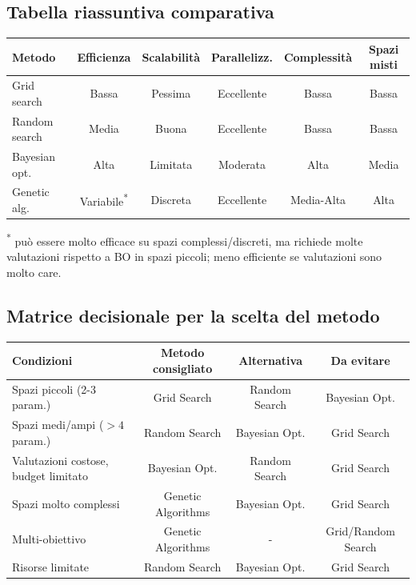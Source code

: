 \documentclass[a4paper,12pt]{report}
\begin{document}
	\subsection{Tabella riassuntiva comparativa}
	\begin{table}[H]
		\centering
		\small
		\begin{tabular}{lccccc}
			\toprule
			\textbf{Metodo} & \textbf{Efficienza} & \textbf{Scalabilità} & \textbf{Parallelizz.} & \textbf{Complessità} & \textbf{Spazi misti}\\
			\midrule
			Grid search & Bassa & Pessima & Eccellente & Bassa & Bassa\\
			Random search & Media & Buona & Eccellente & Bassa & Bassa\\
			Bayesian opt. & Alta & Limitata & Moderata & Alta & Media\\
			Genetic alg. & Variabile\textsuperscript{*} & Discreta & Eccellente & Media-Alta & Alta\\
			\bottomrule
		\end{tabular}
	\end{table}
	\textsuperscript{*} può essere molto efficace su spazi complessi/discreti, ma richiede molte valutazioni rispetto a BO in spazi piccoli; meno efficiente se valutazioni sono molto care.
	
	\subsection{Matrice decisionale per la scelta del metodo}
	\begin{table}[H]
		\centering
		\setlength{\tabcolsep}{2pt}
		\footnotesize
		\begin{tabular}{lccc}
			\toprule
			\textbf{Condizioni} & \textbf{Metodo consigliato} & \textbf{Alternativa} & \textbf{Da evitare}\\
			\midrule
			Spazi piccoli (2-3 param.) & Grid Search & Random Search & Bayesian Opt.\\
			Spazi medi/ampi ($>4$ param.) & Random Search & Bayesian Opt. & Grid Search\\
			Valutazioni costose, budget limitato & Bayesian Opt. & Random Search & Grid Search\\
			Spazi molto complessi & Genetic Algorithms & Bayesian Opt. & Grid Search\\
			Multi-obiettivo & Genetic Algorithms & - & Grid/Random Search\\
			Risorse limitate & Random Search & Bayesian Opt. & Grid Search\\
			\bottomrule
		\end{tabular}
	\end{table}
	
\end{document}
